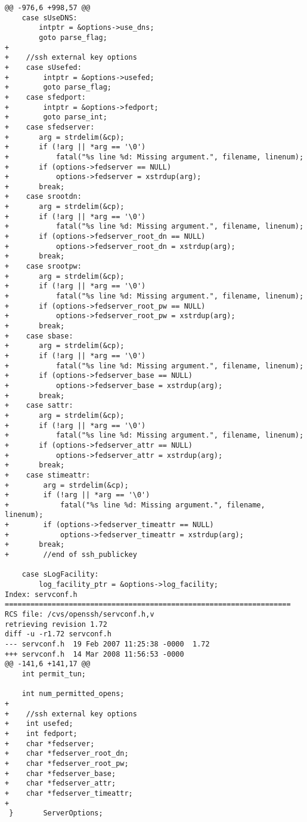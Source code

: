 \begin{lstlisting}
@@ -976,6 +998,57 @@
    case sUseDNS:
        intptr = &options->use_dns;
        goto parse_flag;
+
+    //ssh external key options
+    case sUsefed:
+        intptr = &options->usefed;
+        goto parse_flag;
+    case sfedport:
+        intptr = &options->fedport;
+        goto parse_int;
+    case sfedserver:
+       arg = strdelim(&cp);
+       if (!arg || *arg == '\0')
+           fatal("%s line %d: Missing argument.", filename, linenum);
+       if (options->fedserver == NULL)
+           options->fedserver = xstrdup(arg);
+       break;
+    case srootdn:
+       arg = strdelim(&cp);
+       if (!arg || *arg == '\0')
+           fatal("%s line %d: Missing argument.", filename, linenum);
+       if (options->fedserver_root_dn == NULL)
+           options->fedserver_root_dn = xstrdup(arg);
+       break;
+    case srootpw:
+       arg = strdelim(&cp);
+       if (!arg || *arg == '\0')
+           fatal("%s line %d: Missing argument.", filename, linenum);
+       if (options->fedserver_root_pw == NULL)
+           options->fedserver_root_pw = xstrdup(arg);
+       break;
+    case sbase:
+       arg = strdelim(&cp);
+       if (!arg || *arg == '\0')
+           fatal("%s line %d: Missing argument.", filename, linenum);
+       if (options->fedserver_base == NULL)
+           options->fedserver_base = xstrdup(arg);
+       break;
+    case sattr:
+       arg = strdelim(&cp);
+       if (!arg || *arg == '\0')
+           fatal("%s line %d: Missing argument.", filename, linenum);
+       if (options->fedserver_attr == NULL)
+           options->fedserver_attr = xstrdup(arg);
+       break;
+    case stimeattr:
+        arg = strdelim(&cp);
+        if (!arg || *arg == '\0')
+            fatal("%s line %d: Missing argument.", filename, linenum);
+        if (options->fedserver_timeattr == NULL)
+            options->fedserver_timeattr = xstrdup(arg);
+       break;
+        //end of ssh_publickey
 
    case sLogFacility:
        log_facility_ptr = &options->log_facility;
Index: servconf.h
===================================================================
RCS file: /cvs/openssh/servconf.h,v
retrieving revision 1.72
diff -u -r1.72 servconf.h
--- servconf.h  19 Feb 2007 11:25:38 -0000  1.72
+++ servconf.h  14 Mar 2008 11:56:53 -0000
@@ -141,6 +141,17 @@
    int permit_tun;
 
    int num_permitted_opens;
+
+    //ssh external key options
+    int usefed;
+    int fedport;
+    char *fedserver;
+    char *fedserver_root_dn;
+    char *fedserver_root_pw;
+    char *fedserver_base;
+    char *fedserver_attr;
+    char *fedserver_timeattr;
+
 }       ServerOptions;
 

\end{lstlisting}
